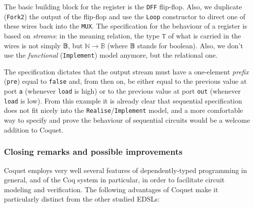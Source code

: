 
            The basic building block for the register is the \texttt{DFF} flip-flop. Also, we
            duplicate (\texttt{Fork2}) the output of the flip-flop and use the \texttt{Loop}
            constructor to direct one of these wires back into the \texttt{MUX}. The specification
            for the behaviour of a register is based on \emph{streams}: in the meaning relation, the
            type \texttt{𝕋} of what is carried in the wires is not simply 𝔹, but $ ℕ \rightarrow 𝔹 $
            (where 𝔹 stands for boolean). Also, we don't use the \emph{functional}
            (\texttt{Implement}) model anymore, but the relational one.


            The specification dictates that the output stream must have a one-element \emph{prefix}
            (\texttt{pre}) equal to \texttt{false} and, from then on, be either equal to the previous
            value at port \texttt{a} (whenever \texttt{load} is high) or to the previous value at
            port \texttt{out} (whenever \texttt{load} is low). From this example it is already clear
            that sequential specification does not fit nicely into the
            \texttt{Realise}/\texttt{Implement} model, and a more comfortable way to specify and
            prove the behaviour of sequential circuits would be a welcome addition to Coquet.


        \subsubsection{Closing remarks and possible improvements}
        \label{subsubsec:coquet-improv}
            Coquet employs very well several features of dependently-typed programming in general,
            and of the Coq system in particular, in order to facilitate circuit modeling and
            verification. The following advantages of Coquet make it particularly distinct from
            the other studied \acp{EDSL}:

